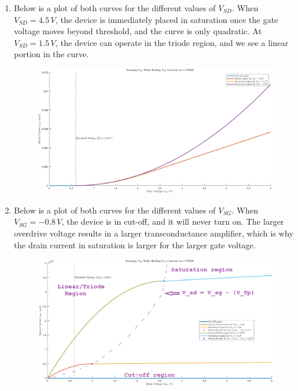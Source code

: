 \documentclass[12pt, fleqn]{article}
\begin{document}
\begin{enumerate}[label=(\alph*)]
    \item
        {
        Below is a plot of both curves for the different values of $V_{SD}$.  When $V_{SD}= 4.5\,V$, the device is immediately placed in saturation once the gate voltage moves beyond threshold, and the curve is only quadratic.  At $V_{SD} = 1.5\,V$, the device can operate in the triode region, and we see a linear portion in the curve.
        \begin{figure}[H]
        \centering
        \includegraphics[scale=0.4]{p3a.png}
        \label{fig:input_char}
        \end{figure}
        }

    \newpage\noindent
    \item
        {
        Below is a plot of both curves for the different values of $V_{SG}$.  When $V_{SG}= -0.8\,V$, the device is in cut-off, and it will never turn on.  The larger overdrive voltage results in a larger transconductance amplifier, which is why the drain current in saturation is larger for the larger gate voltage.
        \begin{figure}[H]
        \centering
        \includegraphics[scale=0.4]{p3b.png}
        \label{fig:output_char}
        \end{figure}
        }


\end{enumerate}
\end{document}
